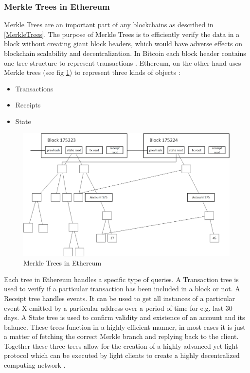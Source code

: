 \subsubsection{Merkle Trees in Ethereum}
Merkle Trees are an important part of any blockchains as described in \ref{MerkleTrees}.  The purpose of Merkle Trees is to efficiently verify the data in a block without creating giant block headers, which would have adverse effects on blockchain scalability and decentralization. In Bitcoin each block header contains one tree structure to represent transactions \cite{misc:025}. Ethereum, on the other hand uses Merkle trees (see fig \ref{fig:EthTree}) to represent three kinds of objects \cite{misc:025}:

\begin{itemize}
\item Transactions 
\item Receipts
\item State
\end{itemize}

\begin{figure}[h]
	\centering
    \includegraphics[width=130mm,scale=1]{figs/ethtree}
	\caption{Merkle Trees in Ethereum \cite{misc:025}}
	\label{fig:EthTree}
\end{figure}

Each tree in Ethereum handles a specific type of queries. A Transaction tree is used to verify if a particular transaction has been included in a block or not.  A Receipt tree handles events. It can be used to get all instances of a particular event X emitted by a particular address over a period of time for e.g. last 30 days. A State tree is used to confirm validity and existence of an account and its balance. These trees function in a highly efficient manner, in most cases it is just a matter of fetching the correct Merkle branch and replying back to the client.  Together these three trees allow for the creation of a highly advanced yet light protocol which can be executed by light clients to create a highly decentralized computing network \cite{misc:025}. 
 
